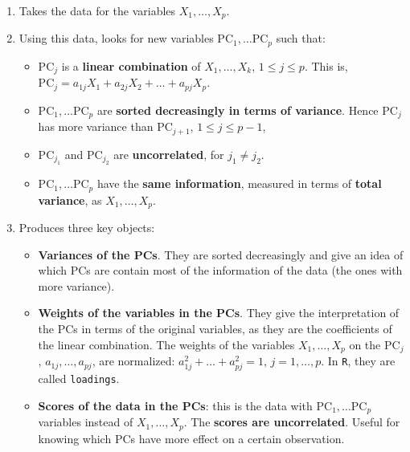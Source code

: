 \documentclass[]{book}
\providecommand{\tightlist}{%
  \setlength{\itemsep}{0pt}\setlength{\parskip}{0pt}}
\begin{document}
\begin{enumerate}
\def\labelenumi{\arabic{enumi}.}
\tightlist
\item
  Takes the data for the variables \(X_1,\ldots,X_p\).
\item
  Using this data, looks for new variables
  \(\text{PC}_1,\ldots \text{PC}_p\) such that:

  \begin{itemize}
  \tightlist
  \item
    \(\text{PC}_j\) is a \textbf{linear combination} of
    \(X_1,\ldots,X_k\), \(1\leq j\leq p\). This is,
    \(\text{PC}_j=a_{1j}X_1+a_{2j}X_2+\ldots+a_{pj}X_p\).
  \item
    \(\text{PC}_1,\ldots \text{PC}_p\) are \textbf{sorted decreasingly
    in terms of variance}. Hence \(\text{PC}_j\) has more variance than
    \(\text{PC}_{j+1}\), \(1\leq j\leq p-1\),
  \item
    \(\text{PC}_{j_1}\) and \(\text{PC}_{j_2}\) are
    \textbf{uncorrelated}, for \(j_1\neq j_2\).
  \item
    \(\text{PC}_1,\ldots \text{PC}_p\) have the \textbf{same
    information}, measured in terms of \textbf{total variance}, as
    \(X_1,\ldots,X_p\).
  \end{itemize}
\item
  Produces three key objects:

  \begin{itemize}
  \tightlist
  \item
    \textbf{Variances of the PCs}. They are sorted decreasingly and give
    an idea of which PCs are contain most of the information of the data
    (the ones with more variance).
  \item
    \textbf{Weights of the variables in the PCs}. They give the
    interpretation of the PCs in terms of the original variables, as
    they are the coefficients of the linear combination. The weights of
    the variables \(X_1,\ldots,X_p\) on the PC\(_j\),
    \(a_{1j},\ldots,a_{pj}\), are normalized:
    \(a_{1j}^2+\ldots+a_{pj}^2=1\), \(j=1,\ldots,p\). In \texttt{R},
    they are called \texttt{loadings}.
  \item
    \textbf{Scores of the data in the PCs}: this is the data with
    \(\text{PC}_1,\ldots \text{PC}_p\) variables instead of
    \(X_1,\ldots,X_p\). The \textbf{scores are uncorrelated}. Useful for
    knowing which PCs have more effect on a certain observation.
  \end{itemize}
\end{enumerate}
\end{document}

